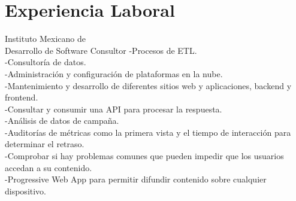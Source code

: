 \documentclass[%
	       doublesided,
	       paper=a4,
	       fontsize=10pt
	      ]{my-resume}
\begin{document}
{    \section[\faGears]{Experiencia Laboral}
	{Instituto Mexicano de \\Desarrollo de Software}
	{Consultor}
	{
	    -Procesos de ETL.\\
	    -Consultoría de datos.\\
	    -Administración y configuración de plataformas en la nube.\\ 
	    -Mantenimiento y desarrollo de diferentes sitios web y aplicaciones, backend y frontend.\\ 
	    -Consultar y consumir una API para procesar la respuesta.\\ 
	    -Análisis de datos de campaña.\\
	    -Auditorías de métricas como la primera vista y el tiempo de interacción para determinar el retraso.\\ 
	    -Comprobar si hay problemas comunes que pueden impedir que los usuarios accedan a su contenido.\\
	    -Progressive Web App para permitir difundir contenido sobre cualquier dispositivo.
	    }
}
\end{document}
